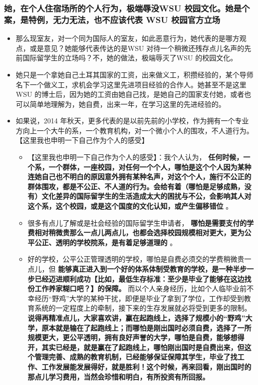 \documentclass[9pt, b5paper]{article}
\begin{document}
\subsubsection{她，在个人住宿场所的个人行为，极端辱没WSU 校园文化。她是个案，是特例，无力无法，也不应该代表 WSU 校园官方立场}
\label{sec-3-2-2}
\begin{itemize}
\item 那么现室友，对一个同为国际人的室友，如此恶意行为，她代表的是哪方观点，或是意见？她能够代表传达的是WSU 对待一个稍微还残存点儿名声的先前国际留学生的立场吗？不，她的做法，极端辱灭了WSU 的校园文化。
\item 她只是一个拿她自己土耳其国家的工资，出来做义工，积攒经验的，某个导师名下一个做义工，求机会学习这里先进项目经验的合作人。她甚至不是这里WSU 的博士后，因为她的工资由她自己找，是她自己的国家支付她，或者也可以简单地理解为，她自费，出来一年，在学习这里的先进经验的。
\item 如果说，2014 年秋天，更多代表的是以前先前的小学校，作为拥有一个专业方向上一个大牛的系，一个教育机构，对一个微小个人的围攻，不人道行为。【这里我也申明一下自己作为个人的感受】
\begin{itemize}
\item 【这里我也申明一下自己作为个人的感受】：我个人认为， \textbf{任何时候，一个系，一个群体，一座校园，对任何一个个人，哪怕是这个个人因为某种连她自己也不明白的原因意外拥有某种名声，对这个个人，施行不公正的群体围攻，都是不公正、不人道的行为。会给有着（哪怕是足够成熟，没有）文化差异的国际留学生的生活造成太大的困扰与不公，会影响其人对这个系，这个校园，或是这个国度的文化认知，或产生偏移错位} 。
\item 很多有点儿了解或是社会经验的国际留学生申请者， \textbf{哪怕是需要支付的学费相对稍微贵那么一点儿两点儿，也都会选择校园规模相对更大，更为公平公正、透明的学校院系，是有着足够道理的} 。
\item 好的学校，公平公正管理透明的学校，哪怕是自费必须交的学费稍微贵一点儿，但 \textbf{能够真正进入到一个好的体系体制受教育的学校，是一种半步一步已经迈进顺利成功【比如，最低生存标准：至少是毕业了能够在这边找份工作养家糊口吧？】的保障。} 而以个人亲身经历，比如个人临毕业前不幸经历“野鸡”大学的某种干扰，即便是毕业了拿到了学位，工作却受到教育系统的一定程度上的牵制，接下来的生存发展就必将受到更多的限制。 \textbf{说得再精准点儿，大家喜欢讲，赢在起跑线上，选择了规模小的“野鸡”大学，原本就是输在了起跑线上；而哪怕是刚出国时必须自费，选择了一所规模更大，更公平透明，拥有良好声誉的大学，哪怕是自费，能够想得开，其实已经是，就是赢在了起跑线上，哪怕刚出国时是自费出来，但这个管理完善、成熟的教育机制，已经能够保证保障其学生，毕业了找工作、工作发展能发展得好，就是胜利！这个时候，再来回看，刚出国时的那点儿学习费用，当然会珍惜和明白，有所投资有所回报。}

\end{itemize}
\end{itemize}
\end{document}
